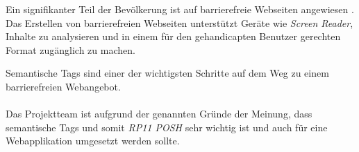 Ein signifikanter Teil der Bevölkerung ist auf barrierefreie Webseiten angewiesen \cite{BarrierefreiesInternet}. Das Erstellen von barrierefreien Webseiten unterstützt Geräte wie \emph{Screen Reader}, Inhalte zu analysieren und in einem für den gehandicapten Benutzer gerechten Format zugänglich zu machen.

Semantische Tags sind einer der wichtigsten Schritte auf dem Weg zu einem barrierefreien Webangebot.
\\ \\
Das Projektteam ist aufgrund der genannten Gründe der Meinung, dass semantische Tags und somit \emph{RP11 POSH} sehr wichtig ist und auch für eine Webapplikation umgesetzt werden sollte.